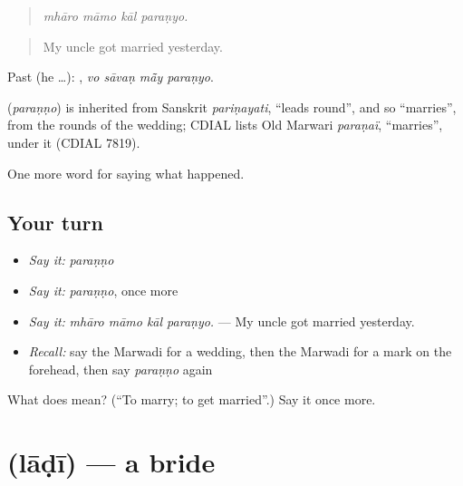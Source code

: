 \begin{quote}
   
\end{quote}

\begin{quote}
\emph{mhāro māmo kāl paraṇyo.}
\end{quote}

\begin{quote}
My uncle got married yesterday.
\end{quote}

Past (he …):    , \emph{vo sāvaṇ mā̃y paraṇyo}.

\begin{cousinweb}
\textbf{} (\emph{paraṇṇo}) is inherited from Sanskrit \emph{pariṇayati}, \textquotedblleft{}leads round\textquotedblright{}, and so \textquotedblleft{}marries\textquotedblright{}, from the rounds of the wedding; CDIAL lists Old Marwari \emph{paraṇaï}, \textquotedblleft{}marries\textquotedblright{}, under it (CDIAL 7819).
\end{cousinweb}

\begin{grammarlens}[title={What you've built}]
One more word for saying what happened.
\end{grammarlens}

\subsection*{Your turn}
\begin{itemize}
\raggedright
  \item \emph{Say it:} \emph{paraṇṇo}
  \item \emph{Say it:} \emph{paraṇṇo}, once more
  \item \emph{Say it:} \emph{mhāro māmo kāl paraṇyo.} — My uncle got married yesterday.
  \item \emph{Recall:} say the Marwadi for a wedding, then the Marwadi for a mark on the forehead, then say \emph{paraṇṇo} again
\end{itemize}

\begin{tcolorbox}[breakable,colback=teal!4,colframe=teal!35!black,title={Before you move on}]
What does  mean? (\textquotedblleft{}To marry; to get married\textquotedblright{}.) Say it once more.
\end{tcolorbox}
\section[\texorpdfstring{\mw{लाडी} (lāḍī)}{लाडी (lāḍī)}]{ (lāḍī) — a bride}

